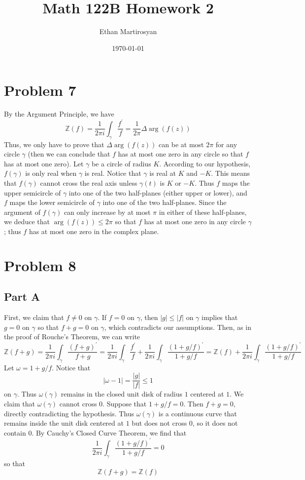 \documentclass[12pt]{article}
\newcommand{\zz}{\mathbb Z}
\begin{document}
 
\title{Math 122B Homework 2}
\author{Ethan Martirosyan}
\date{\today}
\maketitle
{}
\hfuzz=50pt
\section*{Problem 7}
By the Argument Principle, we have
\[
\zz(f) = \frac{1}{2\pi i} \int_\gamma \frac{f^\prime}{f} = \frac{1}{2\pi} \Delta \arg(f(z))
\] Thus, we only have to prove that $\Delta \arg(f(z))$ can be at most $2 \pi$ for any circle $\gamma$ (then we can conclude that $f$ has at most one zero in any circle so that $f$ has at most one zero). Let $\gamma$ be a circle of radius $K$. According to our hypothesis, $f(\gamma)$ is only real when $\gamma$ is real. Notice that $\gamma$ is real at $K$ and $-K$. This means that $f(\gamma)$ cannot cross the real axis unless $\gamma(t)$ is $K$ or $-K$. Thus $f$ maps the upper semicircle of $\gamma$ into one of the two half-planes (either upper or lower), and $f$ maps the lower semicircle of $\gamma$ into one of the two half-planes. Since the argument of $f(\gamma)$ can only increase by at most $\pi$ in either of these half-planes, we deduce that $\arg(f(z)) \leq 2\pi$ so that $f$ has at most one zero in any circle $\gamma$; thus $f$ has at most one zero in the complex plane.
\newpage
\section*{Problem 8}
\subsection*{Part A}
First, we claim that $f \neq 0$ on $\gamma$. If $f = 0$ on $\gamma$, then $\vert g \vert \leq \vert f \vert$ on $\gamma$ implies that $g = 0$ on $\gamma$ so that $f+g = 0$ on $\gamma$, which contradicts our assumptions. Then, as in the proof of Rouche's Theorem, we can write
\[
\zz(f+g) = \frac{1}{2\pi i} \int_\gamma \frac{(f+g)^\prime}{f+g} = \frac{1}{2\pi i} \int_\gamma \frac{f^\prime}{f} + \frac{1}{2\pi i} \int_\gamma \frac{(1+g/f)^\prime}{1+g/f} = \zz(f) + \frac{1}{2\pi i} \int_\gamma \frac{(1+g/f)^\prime}{1+g/f}
\] Let $\omega = 1 + g/f$. Notice that 
\[
\vert \omega - 1 \vert =  \frac{\vert g \vert}{\vert f \vert} \leq 1
\] on $\gamma$. Thus $\omega(\gamma)$ remains in the closed unit disk of radius $1$ centered at $1$. We claim that $\omega(\gamma)$ cannot cross $0$. Suppose that $1+g/f = 0$. Then $f+g = 0$, directly contradicting the hypothesis. Thus $\omega(\gamma)$ is a continuous curve that remains inside the unit disk centered at $1$ but does not cross $0$, so it does not contain $0$. By Cauchy's Closed Curve Theorem, we find that 
\[
\frac{1}{2\pi i} \int_\gamma \frac{(1+g/f)^\prime}{1+g/f} = 0
\] so that 
\[
\zz(f+g) = \zz(f)
\]
\end{document}
